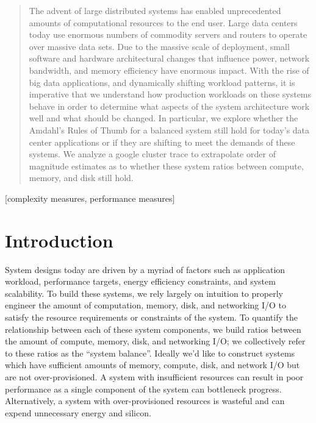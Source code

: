 \documentclass{sig-alternate}
\begin{document}
\maketitle
\begin{abstract}

The advent of large distributed systems has enabled unprecedented amounts of computational resources to the end user.
Large data centers today use enormous numbers of commodity servers and routers to operate over massive data sets.
Due to the massive scale of deployment, small software and hardware architectural changes that influence power, network bandwidth, and memory efficiency have enormous impact.
With the rise of big data applications, and dynamically shifting workload patterns, it is imperative that we understand how production workloads on these systems behave in order to determine what aspects of the system architecture work well and what should be changed.
In particular, we explore whether the Amdahl's Rules of Thumb for a balanced system still hold for today's data center applications or if they are shifting to meet the demands of these systems.
We analyze a google cluster trace to extrapolate order of magnitude estimates as to whether these system ratios between compute, memory, and disk still hold.

\end{abstract}

[complexity measures, performance measures]



\section{Introduction}

System designs today are driven by a myriad of factors such as application workload, performance targets, energy efficiency constraints, and system scalability.
To build these systems, we rely largely on intuition to properly engineer the amount of computation, memory, disk, and networking I/O to satisfy the resource requirements or constraints of the system.
To quantify the relationship between each of these system components, we build ratios between the amount of compute, memory, disk, and networking I/O; we collectively refer to these ratios as the ``system balance''.
Ideally we'd like to construct systems which have sufficient amounts of memory, compute, disk, and network I/O but are not over-provisioned.
A system with insufficient resources can result in poor performance as a single component of the system can bottleneck progress.
Alternatively, a system with over-provisioned resources is wasteful and can expend unnecessary energy and silicon.
\end{document}

